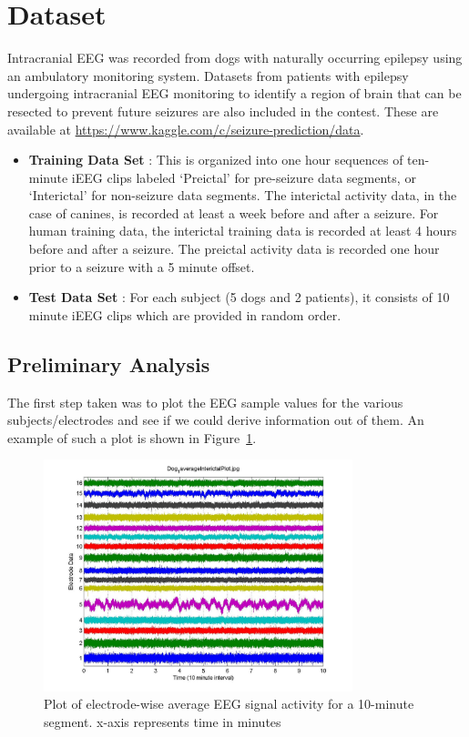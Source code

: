 \documentclass[a4paper]{article}
\begin{document}
\section{Dataset}
Intracranial EEG was recorded from dogs with naturally occurring epilepsy using an ambulatory monitoring system. Datasets from patients with epilepsy undergoing intracranial EEG monitoring to identify a region of brain that can be resected to prevent future seizures are also included in the contest. These are available at \url{https://www.kaggle.com/c/seizure-prediction/data}. 
\begin{itemize}
\item \textbf{Training Data Set} : This is organized into one hour sequences of ten-minute iEEG clips labeled `Preictal' for pre-seizure data segments, or `Interictal' for non-seizure data segments. The interictal activity data, in the case of canines, is recorded at least a week before and after a seizure. For human training data, the interictal training data is recorded at least 4 hours before and after a seizure. The preictal activity data is recorded one hour prior to a seizure with a 5 minute offset.
\item \textbf{Test Data Set} : For each subject (5 dogs and 2 patients), it consists of 10 minute iEEG clips which are
provided in random order. 
\end{itemize}

\subsection{Preliminary Analysis}
\label{prelim}
The first step taken was to plot the EEG sample values for the various subjects/electrodes and see if we could derive information out of them. An example of such a plot is shown in Figure~\ref{fig:eeg}.

\begin{figure}
  \centering
    \includegraphics[width=0.8\textwidth]{EEGPlot.jpg}
  \caption{Plot of electrode-wise average EEG signal activity for a 10-minute segment. x-axis represents time in minutes}
  \label{fig:eeg}
\end{figure}
\end{document}

